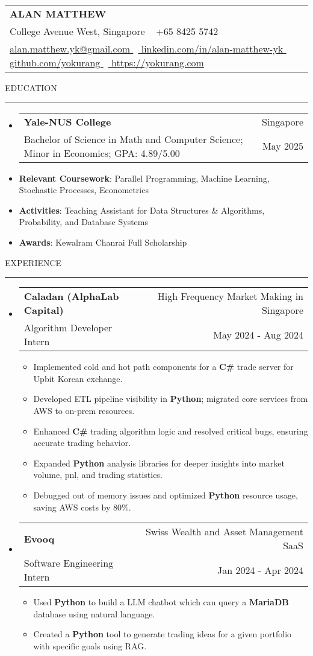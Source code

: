 \documentclass[letterpaper, 11pt]{article}
\makeatletter
\def\sectionlineskip{\medskip}
\def\sectionskip{\medskip}
\def\namesize{\LARGE}
\newcommand{\ResumeHeader}[6]{
  \noindent
  \begin{tabularx}{\textwidth}{>{\centering\arraybackslash}X}
    \namesize\MakeUppercase{\textbf{\fullname}} \\
    #1 \textbar\ #2 \\
    #3 \textbar\ #4 \textbar\ #5 \textbar\ #6 \\
  \end{tabularx}
}
\def \fullname { Alan Matthew }
\def \linkedinlink { https://www.linkedin.com/in/alan-matthew-yk }
\def \linkedintext { linkedin.com/in/alan-matthew-yk }
\def \phonenumber { +65 8425 5742 }
\def \githublink { https://github.com/yokurang }
\def \githubtext { github.com/yokurang }
\def \emaillink { mailto:alan.matthew.yk@gmail.com }
\def \emailtext { alan.matthew.yk@gmail.com }
\def \websitelink { https://yokurang-com.vercel.app/ }
\def \websitetext { https://yokurang.com }
\def \address { 28 College Avenue West, Singapore }
\def \headertype {\ResumeHeader}
\def \linkedin {\href{\linkedinlink}{\linkedintext}}
\def \phone {{\phonenumber}}
\def \email {\href{\emaillink}{\emailtext}}
\def \github {\href{\githublink}{\githubtext}}
\def \website {\href{\websitelink}{\websitetext}}
\newcommand{\SectionHeading}[1]{
  \sectionskip
  \raggedright\raggedbottom\MakeUppercase{\large{#1}}
  \sectionlineskip
  \hrule
  \color{black}
}
\newcommand{\ResumeEntryTSDL}[4]{
  \vspace{1pt}\item
    \begin{tabular*}{\textwidth}[t]{l@{\extracolsep{\fill}}r} 
      \textbf{#1} & #2 \\
      #3 & #4 \\
    \end{tabular*}\vspace{-2.835pt} %
}
\newcommand{\ResumeItem}[2]{
  \item{
    \textbf{#1}{: #2 \vspace{-2.835pt}}
  }
}
\newcommand{\ResumeItemDefault}[1]{
  \item{
    #1 \vspace{-2.835pt}
  }
}
\newcommand{\ResumeSubItem}[2]{\ResumeItem{#1}{#2}\vspace{-2.835pt}}
\newcommand{\ResumeEntryStart}{\begin{itemize}[leftmargin=0mm, label={}]}
\newcommand{\ResumeEntryEnd}{\end{itemize}\vspace{-2.835pt}} %
\newcommand{\ResumeItemListStart}{\begin{itemize}[leftmargin=5mm, label=$\bullet$, itemsep=1mm, parsep=1mm]} %
\newcommand{\ResumeItemListEnd}{\end{itemize}}
\makeatother
\begin{document}
  \headertype{\address}{\phone}{\email}{\linkedin}{\github}{\website}
  
  \SectionHeading{Education}
  \ResumeEntryStart
    \ResumeEntryTSDL{Yale-NUS College} {Singapore}
    {Bachelor of Science in Math and Computer Science; Minor in Economics; GPA: 4.89/5.00} {May 2025}
    \ResumeSubItem{Relevant Coursework}{Parallel Programming, Machine Learning, Stochastic Processes, Econometrics}
    \ResumeSubItem{Activities}{Teaching Assistant for Data Structures \& Algorithms, Probability, and Database Systems}
    \ResumeSubItem{Awards}{Kewalram Chanrai Full Scholarship}
  \ResumeEntryEnd

  \vspace{5pt}

  \SectionHeading{Experience}

  \ResumeEntryStart
  \ResumeEntryTSDL{Caladan (AlphaLab Capital)}{High Frequency Market Making in Singapore}{Algorithm Developer Intern}{May 2024 - Aug 2024}
  \ResumeItemListStart
  \ResumeItemDefault{Implemented cold and hot path components for a \textbf{C\#} trade server for Upbit Korean exchange.}
  \ResumeItemDefault{Developed ETL pipeline visibility in \textbf{Python}; migrated core services from AWS to on-prem resources.}
  \ResumeItemDefault{Enhanced \textbf{C\#} trading algorithm logic and resolved critical bugs, ensuring accurate trading behavior.}
  \ResumeItemDefault{Expanded \textbf{Python} analysis libraries for deeper insights into market volume, pnl, and trading statistics.}
  \ResumeItemDefault{Debugged out of memory issues and optimized \textbf{Python} resource usage, saving AWS costs by 80\%.}
  \ResumeItemListEnd
  \ResumeEntryEnd

  \ResumeEntryStart
    \ResumeEntryTSDL{Evooq}{Swiss Wealth and Asset Management SaaS}{Software Engineering Intern}{Jan 2024 - Apr 2024}
    \ResumeItemListStart
    \ResumeItemDefault{Used \textbf{Python} to build a LLM chatbot which can query a \textbf{MariaDB} database using natural language.}
    \ResumeItemDefault{Created a \textbf{Python} tool to generate trading ideas for a given portfolio with specific goals using RAG.}
    \ResumeItemListEnd
  \ResumeEntryEnd
\end{document}
